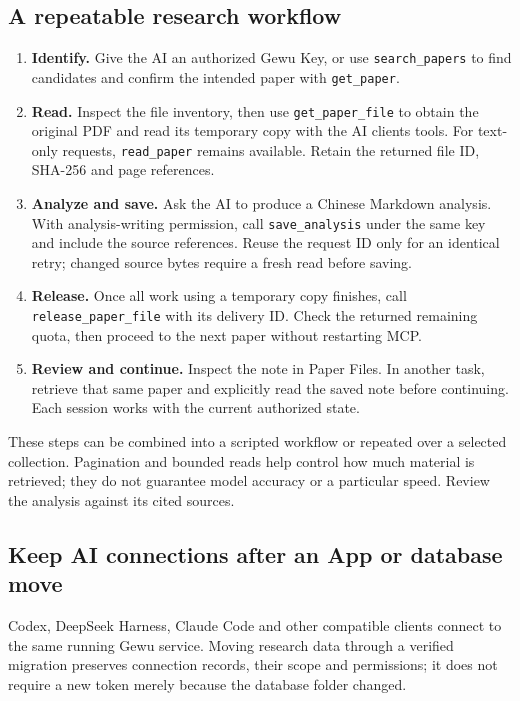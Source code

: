 \documentclass[10pt,letterpaper,oneside]{scrreprt}
\providecommand{\tightlist}{\setlength{\itemsep}{1pt}\setlength{\parskip}{0pt}}
\begin{document}
\subsection{A repeatable research workflow}\label{a-repeatable-research-workflow}

\begin{enumerate}
\tightlist
\item
  \textbf{Identify.} Give the AI an authorized Gewu Key, or use \texttt{search\_papers} to find candidates and confirm the intended paper with \texttt{get\_paper}.
\item
  \textbf{Read.} Inspect the file inventory, then use \texttt{get\_paper\_file} to obtain the original PDF and read its temporary copy with the AI client\textquotesingle s tools. For text-only requests, \texttt{read\_paper} remains available. Retain the returned file ID, SHA-256 and page references.
\item
  \textbf{Analyze and save.} Ask the AI to produce a Chinese Markdown analysis. With analysis-writing permission, call \texttt{save\_analysis} under the same key and include the source references. Reuse the request ID only for an identical retry; changed source bytes require a fresh read before saving.
\item
  \textbf{Release.} Once all work using a temporary copy finishes, call \texttt{release\_paper\_file} with its delivery ID. Check the returned remaining quota, then proceed to the next paper without restarting MCP.
\item
  \textbf{Review and continue.} Inspect the note in Paper Files. In another task, retrieve that same paper and explicitly read the saved note before continuing. Each session works with the current authorized state.
\end{enumerate}

These steps can be combined into a scripted workflow or repeated over a selected collection. Pagination and bounded reads help control how much material is retrieved; they do not guarantee model accuracy or a particular speed. Review the analysis against its cited sources.

\subsection{Keep AI connections after an App or database move}\label{ai-after-migration}

Codex, DeepSeek Harness, Claude Code and other compatible clients connect to the same running Gewu service. Moving research data through a verified migration preserves connection records, their scope and permissions; it does not require a new token merely because the database folder changed.
\end{document}
